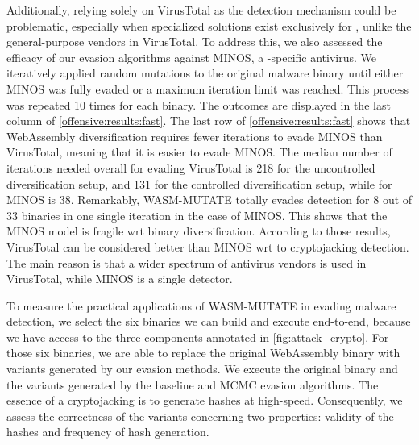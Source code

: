 Additionally, relying solely on VirusTotal as the detection mechanism could be problematic, especially when specialized solutions exist exclusively for \Wasm, unlike the general-purpose vendors in VirusTotal. 
To address this, we also assessed the efficacy of our evasion algorithms against MINOS, a \Wasm-specific antivirus. 
We iteratively applied random mutations to the original malware binary until either MINOS was fully evaded or a maximum iteration limit was reached. 
This process was repeated 10 times for each binary. 
The outcomes are displayed in the last column of \autoref{offensive:results:fast}.
The last row of \autoref{offensive:results:fast} shows that WebAssembly diversification requires fewer iterations to evade MINOS than VirusTotal, meaning that it is easier to evade MINOS.
The median number of iterations needed overall for evading VirusTotal is 218 for the uncontrolled diversification setup, and 131 for the controlled diversification setup, while for MINOS is 38.
Remarkably, WASM-MUTATE totally evades detection for 8 out of 33 binaries in one single iteration in the case of MINOS.
This shows that the MINOS model is fragile wrt binary diversification. 
According to those results, VirusTotal can be considered better than MINOS wrt to cryptojacking detection. 
The main reason is that a wider spectrum of antivirus vendors is used in VirusTotal, while MINOS is a single detector.


To measure the practical applications of WASM-MUTATE in evading malware detection, we select the six binaries we can build and execute end-to-end, because we have access to the three components annotated in \autoref{fig:attack_crypto}.
For those six binaries, we are able to replace the original WebAssembly binary with variants generated by our evasion methods. 
We execute the original binary and the variants generated by the baseline and MCMC evasion algorithms. 
The essence of a cryptojacking is to generate hashes at high-speed. 
Consequently, we assess the correctness of the variants concerning two properties: validity of the hashes and frequency of hash generation. 
  

